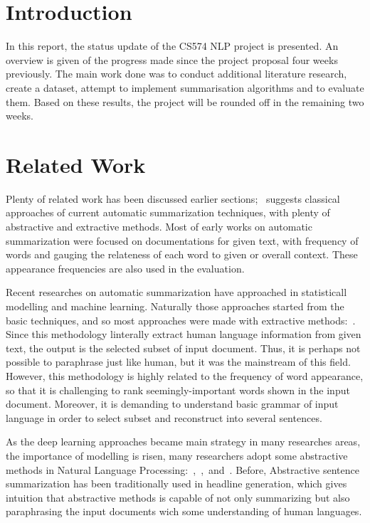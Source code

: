 \section{Introduction}
In this report, the status update of the CS574 NLP project is presented. An
overview is given of the progress made since the project proposal four weeks
previously. The main work done was to conduct additional literature research,
create a dataset, attempt to implement summarisation algorithms and to evaluate
them. Based on these results, the project will be rounded off in the remaining
two weeks.

\section{Related Work}
Plenty of related work has been discussed earlier sections;~\cite{Gaikwad2016} 
suggests classical approaches of current automatic summarization techniques, 
with plenty of abstractive and extractive methods. Most of early works on 
automatic summarization were focused on documentations for given text, with 
frequency of words and gauging the relateness of each word to given or overall
context. These appearance frequencies are also used in the evaluation.

Recent researches on automatic summarization have approached in statisticall
modelling and machine learning. Naturally those approaches started from the
basic techniques, and so most approaches were made with extractive
methods:~\cite{2017arXiv170804439V}. Since this methodology linterally extract
human language information from given text, the output is the selected subset
of input document. Thus, it is perhaps not possible to paraphrase just like
human, but it was the mainstream of this field. However, this methodology is
highly related to the frequency of word appearance, so that it is challenging
to rank seemingly-important words shown in the input document. Moreover, it is
demanding to understand basic grammar of input language in order to select
subset and reconstruct into several sentences.

As the deep learning approaches became main strategy in many researches areas,
the importance of modelling is risen, many researchers adopt some abstractive
methods in Natural Language
Processing:~\cite{2016arXiv160206023N},~\cite{2017arXiv170404368S},~and~\cite{Rush2015}.
Before, Abstractive sentence summarization has been traditionally used in
headline generation, which gives intuition that abstractive methods is capable
of not only summarizing but also paraphrasing the input documents wich some
understanding of human languages. 

